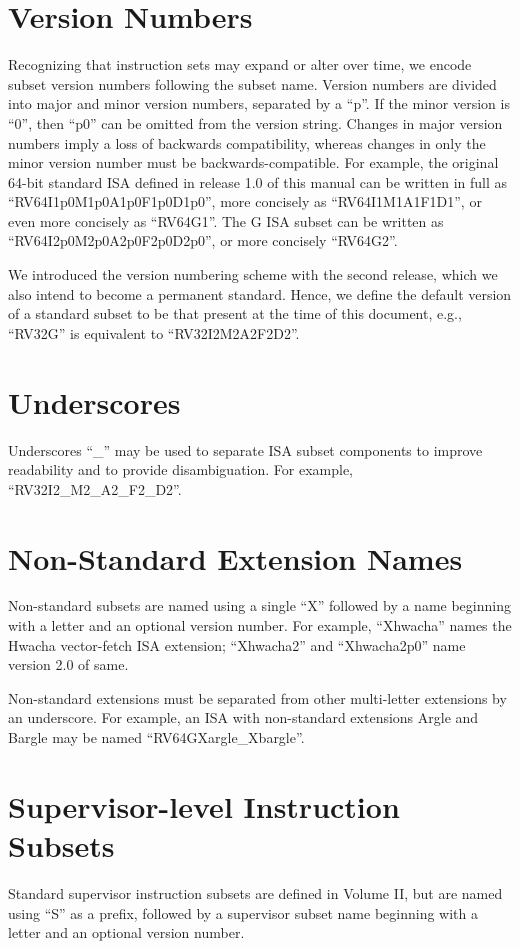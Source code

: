 \section{Version Numbers}
Recognizing that instruction sets may expand or alter over time, we
encode subset version numbers following the subset name.  Version
numbers are divided into major and minor version numbers, separated by
a ``p''.  If the minor version is ``0'', then ``p0'' can be omitted
from the version string.  Changes in major version numbers imply a
loss of backwards compatibility, whereas changes in only the minor
version number must be backwards-compatible.  For example, the
original 64-bit standard ISA defined in release 1.0 of this manual can
be written in full as ``RV64I1p0M1p0A1p0F1p0D1p0'', more concisely as
``RV64I1M1A1F1D1'', or even more concisely as ``RV64G1''.  The G ISA
subset can be written as ``RV64I2p0M2p0A2p0F2p0D2p0'', or more
concisely ``RV64G2''.

We introduced the version numbering scheme with the second release,
which we also intend to become a permanent standard.  Hence, we define
the default version of a standard subset to be that present at the
time of this document, e.g., ``RV32G'' is equivalent to
``RV32I2M2A2F2D2''.

\section{Underscores}

Underscores ``\_'' may be used to separate ISA subset components to
improve readability and to provide disambiguation. For example, ``RV32I2\_M2\_A2\_F2\_D2''.

\section{Non-Standard Extension Names}

Non-standard subsets are named using a single ``X'' followed by a name
beginning with a letter and an optional version number.
For example, ``Xhwacha'' names the Hwacha vector-fetch ISA extension;
``Xhwacha2'' and ``Xhwacha2p0'' name version 2.0 of same.

Non-standard extensions must be separated from other multi-letter extensions
by an underscore.  For example, an ISA with non-standard extensions
Argle and Bargle may be named ``RV64GXargle\_Xbargle''.

\section{Supervisor-level Instruction Subsets}
Standard supervisor instruction subsets are defined in Volume II, but
are named using ``S'' as a prefix, followed by a supervisor subset name
beginning with a letter and an optional version number.

